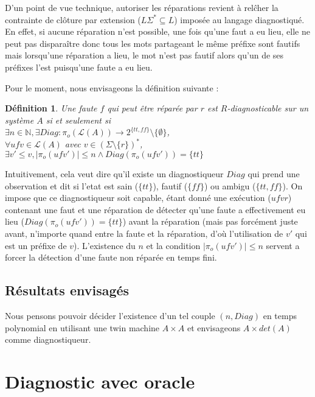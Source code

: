 \documentclass[a4paper,10pt]{article}
\newtheorem{mydef}{D\'efinition}
\begin{document}
D'un point de vue technique, autoriser les r\'eparations revient \`a rel\^cher la contrainte de cl\^oture par extension ($L\Sigma^*\subseteq L$) impos\'ee au langage diagnostiqu\'e. En effet, si aucune r\'eparation n'est possible, une fois qu'une faut a eu lieu, elle ne peut pas dispara\^itre donc tous les mots partageant le m\^eme pr\'efixe sont fautifs mais lorsqu'une r\'eparation a lieu, le mot n'est pas fautif alors qu'un de ses pr\'efixes l'est puisqu'une faute a eu lieu.

Pour le moment, nous envisageons la d\'efinition suivante :

\begin{mydef}
  Une faute $f$ qui peut \^etre r\'epar\'ee par $r$ est $R$-diagnosticable sur un syst\`eme $A$ si et seulement si\\
  $\exists n \in \mathbb N,\exists Diag : \pi_o(\mathcal L(A)) \to 2^{\{tt, ff\}}\setminus \{\emptyset\}$,\\
  $\forall ufv\in \mathcal L(A)$ avec $v\in \left(\Sigma\setminus \{r\}\right)^*$,\\
  $\exists v'\le v, |\pi_o(ufv')| \le n \land Diag(\pi_o(ufv'))=\{tt\}$
\end{mydef}

Intuitivement, cela veut dire qu'il existe un diagnostiqueur $Diag$ qui prend une observation et dit si l'etat est sain ($\{tt\}$), fautif ($\{ff\}$) ou ambigu ($\{tt, ff\}$). On impose que ce diagnostiqueur soit capable, \'etant donn\'e une ex\'ecution ($ufvr$) contenant une faut et une r\'eparation de d\'etecter qu'une faute a effectivement eu lieu ($Diag(\pi_o(ufv'))=\{tt\}$) avant la r\'eparation (mais pas forc\'ement juste avant, n'importe quand entre la faute et la r\'eparation, d'o\`u l'utilisation de $v'$ qui est un pr\'efixe de $v$). L'existence du $n$ et la condition $|\pi_o(ufv')| \le n$ servent a forcer la d\'etection d'une faute non r\'epar\'ee en temps fini.

\subsection{R\'esultats envisag\'es}

Nous pensons pouvoir d\'ecider l'existence d'un tel couple $(n, Diag)$ en temps polynomial en utilisant une twin machine $A\times A$ et envisageons $A\times det(A)$ comme diagnostiqueur.

\section{Diagnostic avec oracle}
\end{document}
